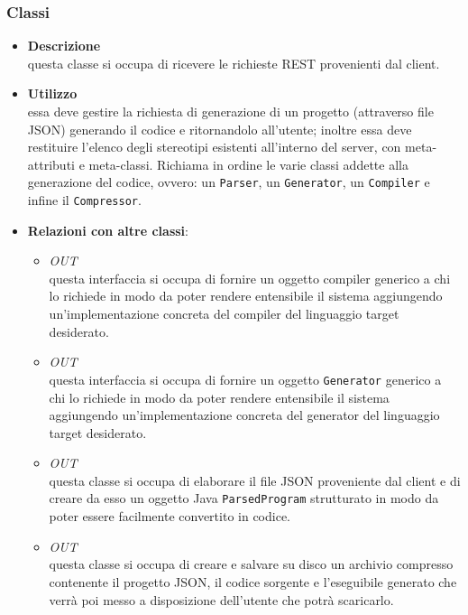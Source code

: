 \subsubsection{Classi}
\label{\nogloxy{swedesigner::server::controller::RequestHandlerController}}
\begin{itemize}
\item \textbf{Descrizione}\\
questa classe si occupa di ricevere le richieste REST provenienti dal client.
\item \textbf{Utilizzo}\\
essa deve gestire la richiesta di generazione di un progetto (attraverso file JSON) generando il codice e ritornandolo all'utente; inoltre essa deve restituire l'elenco degli stereotipi esistenti all'interno del server, con meta-attributi e meta-classi.
Richiama in ordine le varie classi addette alla generazione del codice, ovvero: un \texttt{Parser}, un \texttt{Generator}, un \texttt{Compiler} e infine il \texttt{Compressor}. 
\item \textbf{Relazioni con altre classi}:
\begin{itemize}
\item \textit{OUT} \hyperref[\nogloxy{swedesigner::server::compiler::Compiler}]{}\\
questa interfaccia si occupa di fornire un oggetto compiler generico a chi lo richiede in modo da poter rendere entensibile il sistema aggiungendo un'implementazione concreta del compiler del linguaggio target desiderato.
\item \textit{OUT} \hyperref[\nogloxy{swedesigner::server::generator::Generator}]{}\\
questa interfaccia si occupa di fornire un oggetto \texttt{Generator} generico a chi lo richiede in modo da poter rendere entensibile il sistema aggiungendo un'implementazione concreta del generator del linguaggio target desiderato.
\item \textit{OUT} \hyperref[\nogloxy{swedesigner::server::parser::Parser}]{}\\
questa classe si occupa di elaborare il file JSON proveniente dal client e di creare da esso un oggetto Java \texttt{ParsedProgram} strutturato in modo da poter essere facilmente convertito in codice.
\item \textit{OUT} \hyperref[\nogloxy{swedesigner::server::utility::Compressor}]{}\\
questa classe si occupa di creare e salvare su disco un archivio compresso contenente il progetto JSON, il codice sorgente e l'eseguibile generato che verrà poi messo a disposizione dell'utente che potrà scaricarlo.
\end{itemize}
\end{itemize}
